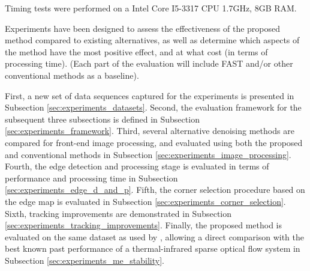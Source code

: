 Timing tests were performed on a Intel Core I5-3317 CPU 1.7GHz, 8GB RAM. 

Experiments have been designed to assess the effectiveness of the proposed method compared to existing alternatives, as well as determine which aspects of the method have the most positive effect, and at what cost (in terms of processing time). 
(Each part of the evaluation will include FAST and/or other conventional methods as a baseline).

First, a new set of data sequences captured for the experiments is presented in Subsection \ref{sec:experiments_datasets}.
Second, the evaluation framework for the subsequent three subsections is defined in Subsection \ref{sec:experiments_framework}.
Third, several alternative denoising methods are compared for front-end image processing, and evaluated using both the proposed and conventional methods in Subsection \ref{sec:experiments_image_processing}.
Fourth, the edge detection and processing stage is evaluated in terms of performance and processing time in Subsection \ref{sec:experiments_edge_d_and_p}.
Fifth, the corner selection procedure based on the edge map is evaluated in Subsection \ref{sec:experiments_corner_selection}.
Sixth, tracking improvements are demonstrated in Subsection \ref{sec:experiments_tracking_improvements}.
Finally, the proposed method is evaluated on the same dataset as used by \cite{Vidas2012}, allowing a direct comparison with the best known past performance of a thermal-infrared sparse optical flow system in Subsection \ref{sec:experiments_me_stability}.